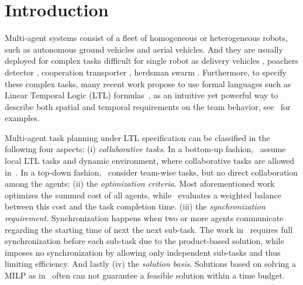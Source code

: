 \section{Introduction}\label{sec:introduction}
Multi-agent systems consist of a fleet of homogeneous or heterogeneous robots,
such as autonomous ground vehicles and aerial vehicles. And they are usually deployed
for complex tasks difficult for single robot as delivery vehicles \cite{toth2002overview}, poachers detector \cite{cliff2015online}
, cooperation transporter \cite{fink2008multi}, herdsman swarm \cite{varava2017herding}.
Furthermore, to specify these complex tasks,
many recent work propose to use formal languages such as Linear Temporal Logic (LTL)
formulas~\cite{baier2008principles}, as an intuitive yet powerful way to describe
both spatial and temporal requirements on the team behavior,
see~\cite{ulusoy2013optimality, kantaros2020stylus, schillinger2018simultaneous, guo2018multirobot} for examples.


Multi-agent task planning under LTL specification can be classified in the following four aspects:
(i) \emph{collaborative tasks}.
In a bottom-up fashion,~\cite{guo2015multi, tumova2016multi, guo2016task} assume local LTL tasks and dynamic environment,
where collaborative tasks are allowed in~\cite{guo2016task}.
In a top-down fashion,~\cite{kantaros2020stylus, schillinger2018simultaneous, luo2021temporal, sahin2019multirobot, jones2019scratchs} consider team-wise tasks,
but no direct collaboration among the agents;
(ii) the \emph{optimization criteria}.
Most aforementioned work~\cite{kantaros2020stylus, guo2016task, luo2021temporal, sahin2019multirobot, jones2019scratchs} optimizes
the summed cost of all agents,
while~\cite{schillinger2018simultaneous} evaluates a weighted balance between this cost and
the task completion time. 
(iii) the \emph{synchronization requirement}.
Synchronization happens when two or more agents communicate regarding the starting time of next the next sub-task.
The work in~\cite{kantaros2020stylus, luo2021abstraction, sahin2019multirobot} requires
full synchronization before each sub-task due to the product-based solution,
while~\cite{schillinger2018simultaneous} imposes no synchronization by allowing
only independent sub-tasks and thus limiting efficiency.
And lastly
(iv) the \emph{solution basis}.
Solutions based on solving a MILP as in~\cite{luo2021temporal, sahin2019multirobot, jones2019scratchs} often can not guarantee a feasible solution within a time budget.

